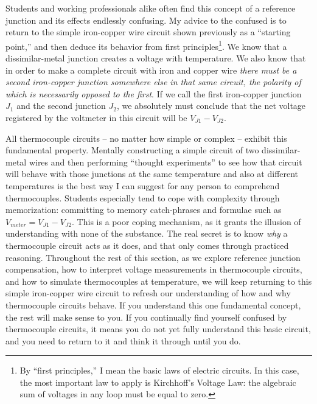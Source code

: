 Students and working professionals alike often find this concept of a reference junction and its effects endlessly confusing.  My advice to the confused is to return to the simple iron-copper wire circuit shown previously as a ``starting point,'' and then deduce its behavior from first principles\footnote{By ``first principles,'' I mean the basic laws of electric circuits.  In this case, the most important law to apply is Kirchhoff's Voltage Law: the algebraic sum of voltages in any loop must be equal to zero.}.  We know that a dissimilar-metal junction creates a voltage with temperature.  We also know that in order to make a complete circuit with iron and copper wire \textit{there must be a second iron-copper junction somewhere else in that same circuit, the polarity of which is necessarily opposed to the first}.  If we call the first iron-copper junction $J_1$ and the second junction $J_2$, we absolutely must conclude that the net voltage registered by the voltmeter in this circuit will be $V_{J1} - V_{J2}$.  

All thermocouple circuits -- no matter how simple or complex -- exhibit this fundamental property.  Mentally constructing a simple circuit of two dissimilar-metal wires and then performing ``thought experiments'' to see how that circuit will behave with those junctions at the same temperature and also at different temperatures is the best way I can suggest for any person to comprehend thermocouples.  Students especially tend to cope with complexity through memorization: committing to memory catch-phrases and formulae such as $V_{meter} = V_{J1} - V_{J2}$.  This is a poor coping mechanism, as it grants the illusion of understanding with none of the substance.  The real secret is to know \textit{why} a thermocouple circuit acts as it does, and that only comes through practiced reasoning.  Throughout the rest of this section, as we explore reference junction compensation, how to interpret voltage measurements in thermocouple circuits, and how to simulate thermocouples at temperature, we will keep returning to this simple iron-copper wire circuit to refresh our understanding of how and why thermocouple circuits behave.  If you understand this one fundamental concept, the rest will make sense to you.  If you continually find yourself confused by thermocouple circuits, it means you do not yet fully understand this basic circuit, and you need to return to it and think it through until you do.     







